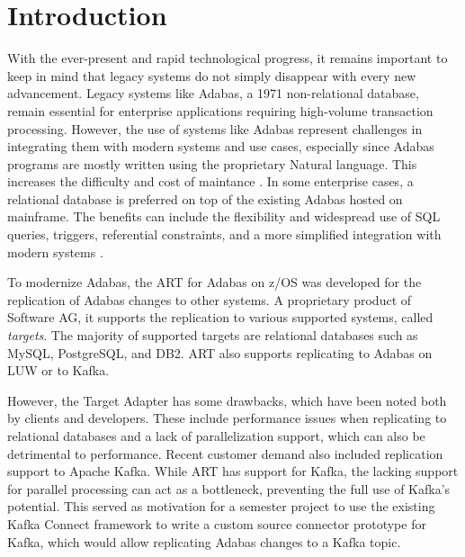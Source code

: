 \chapter{Introduction}
\label{ch01:intro}

With the ever-present and rapid technological progress, it remains important to keep in mind that legacy systems do not simply disappear with every new advancement. Legacy systems like Adabas, a 1971 non-relational database, remain essential for enterprise applications requiring high-volume transaction processing. However, the use of systems like Adabas represent challenges in integrating them with modern systems and use cases, especially since Adabas programs are mostly written using the proprietary Natural language. This increases the difficulty and cost of maintance \cite{ibm_redpaper_key}. In some enterprise cases, a relational database is preferred on top of the existing Adabas hosted on mainframe. The benefits can include the flexibility and widespread use of SQL queries, triggers, referential constraints, and a more simplified integration with modern systems \cite{ibm_redpaper_key}.

To modernize Adabas, the \ac{ART} for Adabas on z/OS was developed for the replication of Adabas changes to other systems. A proprietary product of Software AG, it supports the replication to various supported systems, called \textit{targets}. The majority of supported targets are relational databases such as MySQL, PostgreSQL, and DB2. \ac{ART} also supports replicating to Adabas on \ac{LUW} or to Kafka. %

However, the Target Adapter has some drawbacks, which have been noted both by clients and developers. These include performance issues when replicating to relational databases and a lack of parallelization support, which can also be detrimental to performance. Recent customer demand also included replication support to Apache Kafka. While \ac{ART} has support for Kafka, the lacking support for parallel processing can act as a bottleneck, preventing the full use of Kafka's potential. This served as motivation for a semester project to use the existing Kafka Connect framework to write a custom source connector prototype for Kafka, which would allow replicating Adabas changes to a Kafka topic.

